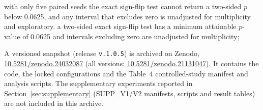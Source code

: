 with only five paired seeds the exact sign-flip test cannot return a two-sided $p$ below 0.0625, and any interval that excludes zero is unadjusted for multiplicity and exploratory.
a two-sided exact sign-flip test has a minimum attainable $p$-value of 0.0625 and intervals excluding zero are unadjusted for multiplicity;

A versioned snapshot (release \texttt{v.1.0.5}) is archived on Zenodo, \href{https://doi.org/10.5281/zenodo.24032087}{10.5281/zenodo.24032087} (all versions: \href{https://doi.org/10.5281/zenodo.21131047}{10.5281/zenodo.21131047}). It contains the code, the locked configurations and the Table~4 controlled-study manifest and analysis scripts. The supplementary experiments reported in Section~\ref{sec:supplementary} (SUPP\_V1/V2 manifests, scripts and result tables) are not included in this archive.
